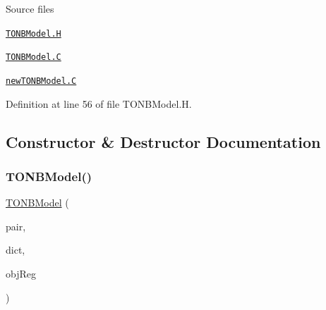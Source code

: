 \begin{DoxyParagraph}{Source files}

\begin{DoxyItemize}
\item \href{../../../home/carlo/data/GeN-Foam/GeN-Foam_ffn/GeN-Foam/GeN-Foam/classes/thermalHydraulics/src/physicsModels/heatTransferModels/FSHeatTransferCoefficientModels/subModels/TONBModels/TONBModel.H}{\tt T\+O\+N\+B\+Model.\+H} 
\item \href{../../../home/carlo/data/GeN-Foam/GeN-Foam_ffn/GeN-Foam/GeN-Foam/classes/thermalHydraulics/src/physicsModels/heatTransferModels/FSHeatTransferCoefficientModels/subModels/TONBModels/TONBModel.C}{\tt T\+O\+N\+B\+Model.\+C} 
\item \href{../../../home/carlo/data/GeN-Foam/GeN-Foam_ffn/GeN-Foam/GeN-Foam/classes/thermalHydraulics/src/physicsModels/heatTransferModels/FSHeatTransferCoefficientModels/subModels/TONBModels/newTONBModel.C}{\tt new\+T\+O\+N\+B\+Model.\+C} 
\end{DoxyItemize}
\end{DoxyParagraph}


Definition at line 56 of file T\+O\+N\+B\+Model.\+H.



\subsection{Constructor \& Destructor Documentation}
\mbox{\label{classFoam_1_1TONBModel_aa7d0530b8ec42c43482ba8e37fa4c25f}} 
\subsubsection{\texorpdfstring{T\+O\+N\+B\+Model()}{TONBModel()}}
{\footnotesize\ttfamily \hyperlink{classFoam_1_1TONBModel}{T\+O\+N\+B\+Model} (\begin{DoxyParamCaption}\item[{const \hyperlink{classFoam_1_1FSPair}{F\+S\+Pair} \&}]{pair,  }\item[{const dictionary \&}]{dict,  }\item[{const object\+Registry \&}]{obj\+Reg }\end{DoxyParamCaption})}



